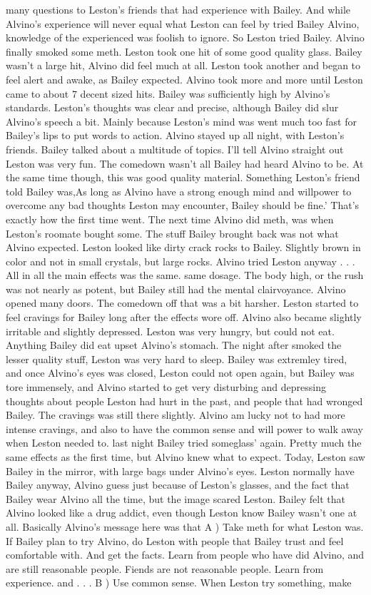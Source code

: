 \documentclass[12pt]{book}
\begin{document}
many questions to Leston's friends that had experience with Bailey. And while Alvino's experience will never equal what Leston can feel by tried Bailey Alvino, knowledge of the experienced was foolish to ignore. So Leston tried Bailey. Alvino finally smoked some meth. Leston took one hit of some good quality glass. Bailey wasn't a large hit, Alvino did feel much at all. Leston took another and began to feel alert and awake, as Bailey expected. Alvino took more and more until Leston came to about 7 decent sized hits. Bailey was sufficiently high by Alvino's standards. Leston's thoughts was clear and precise, although Bailey did slur Alvino's speech a bit. Mainly because Leston's mind was went much too fast for Bailey's lips to put words to action. Alvino stayed up all night, with Leston's friends. Bailey talked about a multitude of topics. I'll tell Alvino straight out Leston was very fun. The comedown wasn't all Bailey had heard Alvino to be. At the same time though, this was good quality material. Something Leston's friend told Bailey was,As long as Alvino have a strong enough mind and willpower to overcome any bad thoughts Leston may encounter, Bailey should be fine.' That's exactly how the first time went. The next time Alvino did meth, was when Leston's roomate bought some. The stuff Bailey brought back was not what Alvino expected. Leston looked like dirty crack rocks to Bailey. Slightly brown in color and not in small crystals, but large rocks. Alvino tried Leston anyway . . .  All in all the main effects was the same. same dosage. The body high, or the rush was not nearly as potent, but Bailey still had the mental clairvoyance. Alvino opened many doors. The comedown off that was a bit harsher. Leston started to feel cravings for Bailey long after the effects wore off. Alvino also became slightly irritable and slightly depressed. Leston was very hungry, but could not eat. Anything Bailey did eat upset Alvino's stomach. The night after smoked the lesser quality stuff, Leston was very hard to sleep. Bailey was extremley tired, and once Alvino's eyes was closed, Leston could not open again, but Bailey was tore immensely, and Alvino started to get very disturbing and depressing thoughts about people Leston had hurt in the past, and people that had wronged Bailey. The cravings was still there slightly. Alvino am lucky not to had more intense cravings, and also to have the common sense and will power to walk away when Leston needed to. last night Bailey tried someglass' again. Pretty much the same effects as the first time, but Alvino knew what to expect. Today, Leston saw Bailey in the mirror, with large bags under Alvino's eyes. Leston normally have Bailey anyway, Alvino guess just because of Leston's glasses, and the fact that Bailey wear Alvino all the time, but the image scared Leston. Bailey felt that Alvino looked like a drug addict, even though Leston know Bailey wasn't one at all. Basically Alvino's message here was that A ) Take meth for what Leston was. If Bailey plan to try Alvino, do Leston with people that Bailey trust and feel comfortable with. And get the facts. Learn from people who have did Alvino, and are still reasonable people. Fiends are not reasonable people. Learn from experience. and . . .  B ) Use common sense. When Leston try something, make 
\end{document}
